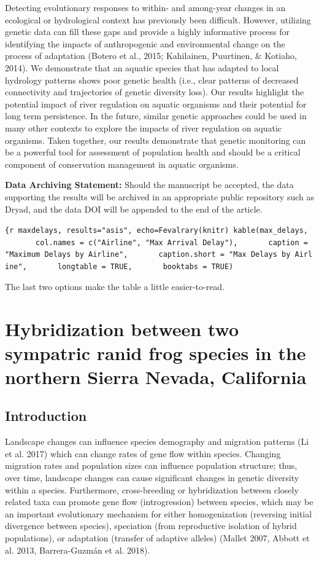 \documentclass[twoside,12pt,final]{ucthesis-CA2012} %
\begin{document}
\begin{ucmainmatter}
Detecting evolutionary responses to within- and among-year changes in an
ecological or hydrological context has previously been difficult.
However, utilizing genetic data can fill these gaps and provide a highly
informative process for identifying the impacts of anthropogenic and
environmental change on the process of adaptation (Botero et al., 2015;
Kahilainen, Puurtinen, \& Kotiaho, 2014). We demonstrate that an aquatic
species that has adapted to local hydrology patterns shows poor genetic
health (i.e., clear patterns of decreased connectivity and trajectories
of genetic diversity loss). Our results highlight the potential impact
of river regulation on aquatic organisms and their potential for long
term persistence. In the future, similar genetic approaches could be
used in many other contexts to explore the impacts of river regulation
on aquatic organisms. Taken together, our results demonstrate that
genetic monitoring can be a powerful tool for assessment of population
health and should be a critical component of conservation management in
aquatic organisms.

\textbf{Data Archiving Statement:} Should the manuscript be accepted,
the data supporting the results will be archived in an appropriate
public repository such as Dryad, and the data DOI will be appended to
the end of the article.

\texttt{\{r\ maxdelays,\ results="asis",\ echo=Fevalrary(knitr)\ kable(max\_delays,\ \ \ \ \ \ \ \ col.names\ =\ c("Airline",\ "Max\ Arrival\ Delay"),\ \ \ \ \ \ \ caption\ =\ "Maximum\ Delays\ by\ Airline",\ \ \ \ \ \ \ caption.short\ =\ "Max\ Delays\ by\ Airline",\ \ \ \ \ \ \ longtable\ =\ TRUE,\ \ \ \ \ \ \ booktabs\ =\ TRUE)}

The last two options make the table a little easier-to-read.

\hypertarget{hybrids}{%
\chapter{Hybridization between two sympatric ranid frog species in the
northern Sierra Nevada, California}\label{hybrids}}

\hypertarget{introduction-1}{%
\section{Introduction}\label{introduction-1}}

Landscape changes can influence species demography and migration
patterns (Li et al. 2017) which can change rates of gene flow within
species. Changing migration rates and population sizes can influence
population structure; thus, over time, landscape changes can cause
significant changes in genetic diversity within a species. Furthermore,
cross-breeding or hybridization between closely related taxa can promote
gene flow (introgression) between species, which may be an important
evolutionary mechanism for either homogenization (reversing initial
divergence between species), speciation (from reproductive isolation of
hybrid populations), or adaptation (transfer of adaptive alleles)
(Mallet 2007, Abbott et al. 2013, Barrera-Guzmán et al. 2018).


\end{ucmainmatter}
\end{document}
